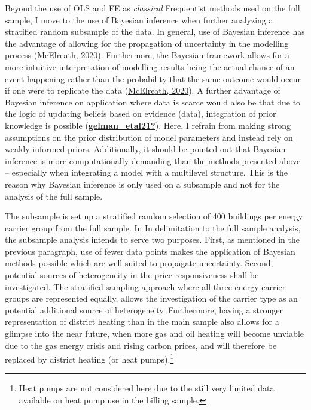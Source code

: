 \documentclass[12pt,twoside]{reedthesis}
\begin{document}
Beyond the use of OLS and FE as \emph{classical} Frequentist methods used on the full sample, I move to the use of Bayesian inference when further analyzing a stratified random subsample of the data. In general, use of Bayesian inference has the advantage of allowing for the propagation of uncertainty in the modelling process (\protect\hyperlink{ref-mcelreath20}{McElreath, 2020}). Furthermore, the Bayesian framework allows for a more intuitive interpretation of modelling results being the actual chance of an event happening rather than the probability that the same outcome would occur if one were to replicate the data (\protect\hyperlink{ref-mcelreath20}{McElreath, 2020}). A further advantage of Bayesian inference on application where data is scarce would also be that due to the logic of updating beliefs based on evidence (data), integration of prior knowledge is possible (\protect\hyperlink{ref-gelman_etal21}{\textbf{gelman\_etal21?}}). Here, I refrain from making strong assumptions on the prior distribution of model parameters and instead rely on weakly informed priors. Additionally, it should be pointed out that Bayesian inference is more computationally demanding than the methods presented above -- especially when integrating a model with a multilevel structure. This is the reason why Bayesian inference is only used on a subsample and not for the analysis of the full sample.

The subsample is set up a stratified random selection of 400 buildings per energy carrier group from the full sample. In In delimitation to the full sample analysis, the subsample analysis intends to serve two purposes. First, as mentioned in the previous paragraph, use of fewer data points makes the application of Bayesian methods possible which are well-suited to propagate uncertainty. Second, potential sources of heterogeneity in the price responsiveness shall be investigated. The stratified sampling approach where all three energy carrier groups are represented equally, allows the investigation of the carrier type as an potential additional source of heterogeneity. Furthermore, having a stronger representation of district heating than in the main sample also allows for a glimpse into the near future, when more gas and oil heating will become unviable due to the gas energy crisis and rising carbon prices, and will therefore be replaced by district heating (or heat pumps).\footnote{Heat pumps are not considered here due to the still very limited data available on heat pump use in the billing sample.}
\end{document}
